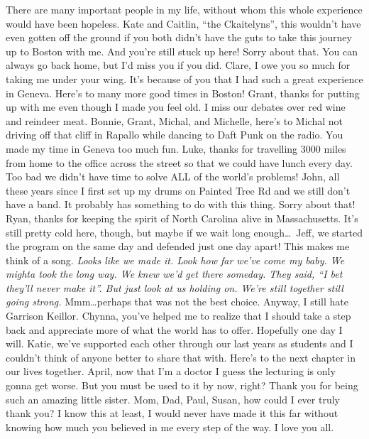 There are many important people in my life, without whom this whole experience would have been hopeless.
Kate and Caitlin, ``the Ckaitelyns'', this wouldn't have even gotten off the ground  if you both didn't have the guts to take this journey up to Boston with me.  And you're still stuck up here!  Sorry about that. You can always go back home, but I'd miss you if you did. 
Clare, I owe you so much for taking me under your wing. It's because of you that I had such a great experience in Geneva. Here's to many more good times in Boston!
Grant, thanks for putting up with me even though I made you feel old. I miss our debates over red wine and reindeer meat.
Bonnie, Grant, Michal, and Michelle, here's to Michal not driving off that cliff in Rapallo while dancing to Daft Punk on the radio. You made my time in Geneva too much fun.
Luke, thanks for travelling 3000 miles from home to the office across the street so that we could have lunch every day. Too bad we didn't have time to solve ALL of the world's problems!
John, all these years since I first set up my drums on Painted Tree Rd and we still don't have a band. It probably has something to do with this thing. Sorry about that!
Ryan, thanks for keeping the spirit of North Carolina alive in Massachusetts. It's still pretty cold here, though, but maybe
if we wait long enough\dots~Jeff, we started the program on the same day and defended just one day apart! This makes me think of a song. \emph{Looks like we made it. Look how far we've come my baby. We mighta took the long way. We knew we'd get there someday. They said, ``I bet they'll never make it''. But just look at us holding on. We're still together still going strong.} Mmm\dots perhaps that was not the best choice.  Anyway, I still hate Garrison Keillor.
Chynna, you've helped me to realize that I should take a step back and appreciate more of what the world has to offer.
Hopefully one day I will.
Katie, we've supported each other through our last years as students and I couldn't think of anyone better to share that
with. Here's to the next chapter in our lives together.
April, now that I'm a doctor I guess the lecturing is only gonna get worse. But you must be used to it by now, right?
Thank you for being such an amazing little sister.
Mom, Dad, Paul, Susan, how could I ever truly thank you? I know this at least, I would never have made it this far without knowing how much you believed in me every step of the way.  I love you all.
